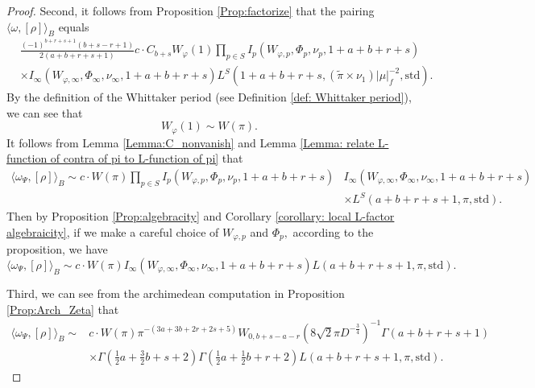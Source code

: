 \documentclass[11pt, a4paper]{amsart}
\theoremstyle{plain}
\theoremstyle{definition}
\numberwithin{equation}{section}
\begin{document}
\begin{proof}
    
    \par Second, it follows from Proposition \ref{Prop:factorize} that the pairing $\langle \omega, [\rho] \rangle_{B}$ equals 
    \begin{align*}
         & \frac{(-1)^{b + r + s + 1}(b + s - r + 1)}{2(a + b + r + s + 1)}  c \cdot C_{b + s} W_{\varphi}(1)  \prod_{p \in S} I_{p}(W_{\varphi, p}, \Phi_p, \nu_p, 1 + a + b + r + s) \\ 
        &\times I_{\infty}(W_{\varphi, \infty}, \Phi_\infty, \nu_\infty, 1 + a + b + r + s) L^{S}(1 + a + b + r + s, (\tilde{\pi} \times \nu_1 )|\mu|_{f}^{-2}, \mathrm{std}). 
    \end{align*} 
    By the definition of the Whittaker period (see Definition \ref{def: Whittaker period}), we can see that 
    \begin{equation*}
        W_{\varphi}(1) \sim W(\pi). 
    \end{equation*}
    It follows from Lemma \ref{Lemma:C_nonvanish} and Lemma \ref{Lemma: relate L-function of contra of pi to L-function of pi} that 
    \begin{align*}
        \langle \omega_{\Psi}, [\rho] \rangle_{B}  \sim c \cdot W(\pi)  \prod_{p \in S} I_{p}(W_{\varphi, p}, \Phi_p, \nu_p, 1 + a + b + r + s) & I_{\infty}(W_{\varphi, \infty}, \Phi_\infty, \nu_\infty, 1 + a + b + r + s)  \\
        & \times L^{S}(a + b + r + s + 1, \pi, \mathrm{std}). 
    \end{align*}
    Then by Proposition \ref{Prop:algebracity} and Corollary \ref{corollary: local L-factor algebraicity}, if we make a careful choice of $W_{\varphi, p}$ and $\Phi_p,$ according to the proposition, we have 
    \begin{equation*}
        \langle \omega_{\Psi}, [\rho] \rangle_{B}  \sim c \cdot W(\pi) I_{\infty}(W_{\varphi, \infty}, \Phi_\infty, \nu_\infty, 1 + a + b + r + s)L(a + b + r + s + 1, \pi, \mathrm{std}). 
    \end{equation*}
    \par Third, we can see from the archimedean computation in Proposition \ref{Prop:Arch_Zeta} that 
    \begin{align*}
        \langle \omega_{\Psi}, [\rho] \rangle_{B}  \sim & c \cdot W(\pi)  \pi^{-(3a + 3b + 2r + 2s + 5)} W_{0, b + s - a - r}(8\sqrt{2}\pi D^{-\frac{3}{4}})^{-1} \Gamma(a + b + r + s + 1)\\
                & \times \Gamma( \frac{1}{2}a + \frac{3}{2}b + s + 2) \Gamma(\frac{1}{2}a + \frac{1}{2} b + r + 2) L(a + b + r + s + 1, \pi, \mathrm{std}). 

\end{align*}
\end{proof}
\end{document}
